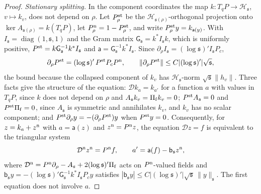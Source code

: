 \documentclass[11pt]{amsart}
\theoremstyle{definition}
\theoremstyle{remark}
\theoremstyle{plain}
\numberwithin{equation}{section}
\begin{document}
\begin{proof}
\emph{Stationary splitting.} In the component coordinates the map $k\colon
T_qP\to\mathcal H_{\mathfrak s}$, $v\mapsto k_v$, does not depend on $\rho$. Let $P^{\rm st}_\rho$
be the $\mathcal H_{{\mathfrak s}(\rho)}$-orthogonal projection onto $\ker A_{{\mathfrak s}(\rho)}=k(T_qP)$,
let $P^{\rm n}_\rho=1-P^{\rm st}_\rho$, and write $P^{\rm st}_\rho y=k_{\mathsf a(y)}$. With
$I_{\mathfrak s}=\operatorname{diag}(1,{\mathfrak s},1)$ and the Gram matrix $\mathsf G_{\mathfrak s}=k^*I_{\mathfrak s} k$,
which is uniformly positive, $P^{\rm st}=k\mathsf G_{\mathfrak s}^{-1}k^*I_{\mathfrak s}$ and $\mathsf
a=\mathsf G_{\mathfrak s}^{-1}k^*I_{\mathfrak s}$. Since $\partial_\rho I_{\mathfrak s}=(\log{\mathfrak s})'I_{\mathfrak s} P_c$,
\begin{equation}\label{eq:projection-derivative}
\partial_\rho P^{\rm st}=(\log{\mathfrak s})'\,P^{\rm st}P_cP^{\rm n},\qquad
\|\partial_\rho P^{\rm st}\|\le C|(\log{\mathfrak s})'|\sqrt{\mathfrak s} ,
\end{equation}
the bound because the collapsed component of $k_v$ has $\mathcal H_{\mathfrak s}$-norm
$\sqrt{\mathfrak s}\|h_v\|$. Three facts give the structure of the equation: $\mathcal
Dk_a=k_{a'}$ for a function $a$ with values in $T_qP$, since $k$ does not depend on
$\rho$ and $A_{\mathfrak s} k_v=\Pi_{\rm f}k_v=0$; $P^{\rm st}A_{\mathfrak s}=0$ and $P^{\rm st}\Pi_{\rm f}=0$, since
$A_{\mathfrak s}$ is symmetric and annihilates $k_v$, and $k_v$ has no scalar component; and
$P^{\rm st}\partial_\rho y=-(\partial_\rho P^{\rm st})y$ when $P^{\rm st}y=0$.
Consequently, for $z=k_a+z^{\rm n}$ with $a=\mathsf a(z)$ and $z^{\rm n}=P^{\rm n}z$,
the equation $\mathcal Dz=f$ is equivalent to the triangular system
\begin{equation}\label{eq:triangular}
\mathcal D^{\rm n}z^{\rm n}=P^{\rm n}f,\qquad a'=\mathsf a(f)-\mathsf b_{\mathfrak s} z^{\rm n},
\end{equation}
where $\mathcal D^{\rm n}=P^{\rm n}\partial_\rho-A_{\mathfrak s}+2(\log{\mathfrak s})'\Pi_{\rm f}$ acts on
$P^{\rm n}$-valued fields and $\mathsf b_{\mathfrak s} y=-(\log{\mathfrak s})'\mathsf
G_{\mathfrak s}^{-1}k^*I_{\mathfrak s} P_cy$ satisfies $|\mathsf b_{\mathfrak s} y|\le
C|(\log{\mathfrak s})'|\sqrt{\mathfrak s}\,\|y\|_{\mathfrak s}$. The first equation does not involve $a$.


\end{proof}
\end{document}
